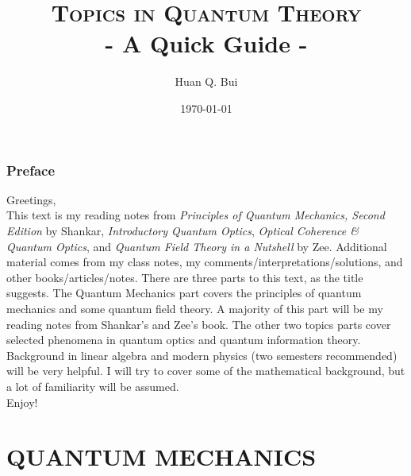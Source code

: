 \documentclass{book}
\theoremstyle{definition}
\begin{document}
\begin{titlepage}\centering
 \clearpage
 \title{{\textsc{\textbf{Topics in Quantum Theory}}}\\ \smallskip - A Quick Guide - \\}
 \author{\bigskip Huan Q. Bui}
 \date{\today}
 \maketitle
 \thispagestyle{empty}
\end{titlepage}

\subsection*{Preface}

Greetings,\\

This text is my reading notes from \textit{Principles of Quantum Mechanics, Second Edition} by Shankar, \textit{Introductory Quantum Optics}, \textit{Optical Coherence \& Quantum Optics}, and \textit{Quantum Field Theory in a Nutshell} by Zee. Additional material comes from my class notes, my comments/interpretations/solutions, and other books/articles/notes. There are three parts to this text, as the title suggests. The Quantum Mechanics part covers the principles of quantum mechanics and some quantum field theory. A majority of this part will be my reading notes from Shankar's and Zee's book. The other two topics parts cover selected phenomena in quantum optics and quantum information theory.  \\

Background in linear algebra and modern physics (two semesters recommended) will be very helpful. I will try to cover some of the mathematical background, but a lot of familiarity will be assumed. \\

Enjoy!

\newpage
\tableofcontents
\newpage





\chapter{QUANTUM MECHANICS}
\end{document}
